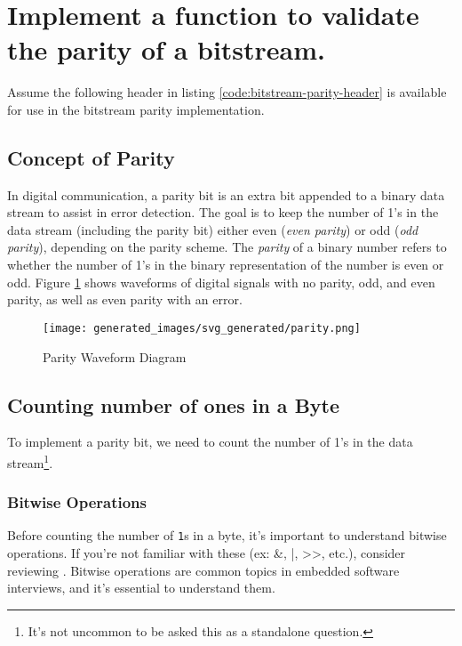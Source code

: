 \documentclass[main.tex]{subfiles}
\begin{document}
\section{Implement a function to validate the parity of a bitstream.}
Assume the following header in listing \ref{code:bitstream-parity-header} is available for use in the bitstream parity implementation. 



\spoilerline
\subsection{Concept of Parity}
In digital communication, a parity bit is an extra bit appended to a binary data stream to assist in error detection. The goal is to keep the number of 1's in the data stream (including the parity bit) either even (\textit{even parity}) or odd (\textit{odd parity}), depending on the parity scheme. The \textit{parity} of a binary number refers to whether the number of 1's in the binary representation of the number is even or odd. Figure \ref{fig:parity-waveform-diagram} shows waveforms of digital signals with no parity, odd, and even parity, as well as even parity with an error. 

\begin{figure}[H]
    \centering
    \texttt{[image: generated\_images/svg\_generated/parity.png]}
    \caption{Parity Waveform Diagram}
    \label{fig:parity-waveform-diagram}
\end{figure}

\subsection {Counting number of ones in a Byte}
To implement a parity bit, we need to count the number of 1's in the data stream\footnote{It's not uncommon to be asked this as a standalone question.}. 
\subsubsection{Bitwise Operations}
Before counting the number of \texttt{1}s in a byte, it’s important to understand bitwise operations. If you’re not familiar with these (ex: \&, |, >>, etc.), consider reviewing . Bitwise operations are common topics in embedded software interviews, and it's essential to understand them.
\end{document}
